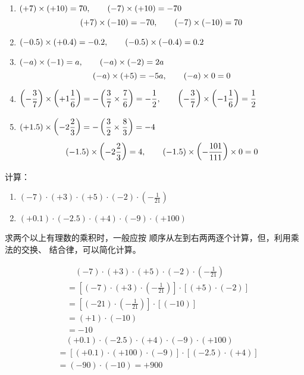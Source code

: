 \begin{solution}
	\begin{enumerate}
		\item $(+7)\times (+10)=70,\qquad (-7)\times (+10)=-70$ 
		\[(+7)\times (-10)=-70,\qquad (-7)\times (-10)=70\]
		\item $(-0.5)\times (+0.4)=-0.2,\qquad (-0.5)\times (-0.4)=0.2$
		\item $(-a)\times (-1)=a,\qquad (-a)\times (-2)=2a$  $$(-a)\times (+5)=-5a,\qquad (-a)\times 0=0$$
		\item $\left(-\dfrac{3}{7}\right)\times \left(+1\dfrac{1}{6}\right)=-\left(\dfrac{3}{7}\times\dfrac{7}{6}\right)=-\dfrac{1}{2},\qquad \left(-\dfrac{3}{7}\right)\times \left(-1\dfrac{1}{6}\right)=\dfrac{1}{2} $
		\item  $(+1.5)\times \left(-2\dfrac{2}{3}\right)=-\left(\dfrac{3}{2}\times\dfrac{8}{3}\right)=-4$
		\[(-1.5)\times \left(-2\dfrac{2}{3}\right)=4,\qquad (-1.5)\times \left(-\dfrac{101}{111}\right)\times 0=0 \]
	\end{enumerate}
	
\end{solution}  

\begin{example}
	计算：
	\begin{enumerate}
		\item $(-7) \cdot(+3) \cdot(+5) \cdot(-2) \cdot\left(-\frac{1}{21}\right)$
		\item 
		$(+0.1) \cdot(-2.5) \cdot(+4) \cdot(-9) \cdot(+100)$
	\end{enumerate}
\end{example}

\begin{analyze}
	求两个以上有理数的乘积时，一般应按
	顺序从左到右两两逐个计算，但，利用乘法的交换、
	结合律，可以简化计算。
\end{analyze}

\begin{solution}
	\begin{align*}
	&\quad   (-7) \cdot(+3) \cdot(+5) \cdot(-2) \cdot\left(-\frac{1}{21}\right)\\
	&=\left[(-7)\cdot (+3)\cdot \left(-\frac{1}{21}\right)\right]\cdot [(+5)\cdot (-2)]\tag{交换、结合律}\\
	&=\left[(-21)\cdot \left(-\frac{1}{21}\right)\right]\cdot [(-10)] \tag{异号相乘法则}\\
	&=(+1)\cdot (-10) \tag{同号相乘法则}\\
	&=-10 \tag{1的特性}
	\end{align*} 
	\begin{align*}
	&\quad (+0.1) \cdot(-2.5) \cdot(+4) \cdot(-9) \cdot(+100)\\
	&=[(+0.1)\cdot (+100)\cdot(-9)]\cdot[(-2.5)\cdot (+4)]\\
	&=(-90)\cdot (-10)=+900
	\end{align*}    
\end{solution}

